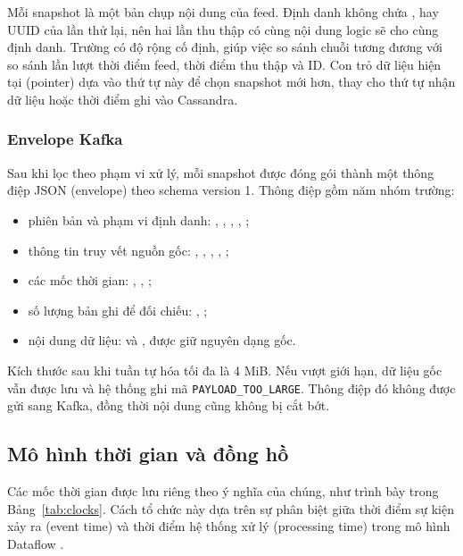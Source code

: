 Mỗi snapshot là một bản chụp nội dung của feed. Định danh  không chứa ,  hay UUID của lần thử lại, nên hai lần thu thập có cùng nội dung logic sẽ cho cùng định danh. Trường  có độ rộng cố định, giúp việc so sánh chuỗi tương đương với so sánh lần lượt thời điểm feed, thời điểm thu thập và ID. Con trỏ dữ liệu hiện tại (pointer) dựa vào thứ tự này để chọn snapshot mới hơn, thay cho thứ tự nhận dữ liệu hoặc thời điểm ghi vào Cassandra.

\subsubsection{Envelope Kafka}

Sau khi lọc theo phạm vi xử lý, mỗi snapshot được đóng gói thành một thông điệp JSON (envelope) theo schema version 1. Thông điệp gồm năm nhóm trường:
\begin{itemize}
    \item phiên bản và phạm vi định danh: , , , , ;
    \item thông tin truy vết nguồn gốc: , , , , ;
    \item các mốc thời gian: , , ;
    \item số lượng bản ghi để đối chiếu: , ;
    \item nội dung dữ liệu:  và , được giữ nguyên dạng gốc.
\end{itemize}
Kích thước sau khi tuần tự hóa tối đa là 4 MiB. Nếu vượt giới hạn, dữ liệu gốc vẫn được lưu và hệ thống ghi mã \texttt{PAYLOAD\_TOO\_LARGE}. Thông điệp đó không được gửi sang Kafka, đồng thời nội dung cũng không bị cắt bớt.

\subsection{Mô hình thời gian và đồng hồ}

Các mốc thời gian được lưu riêng theo ý nghĩa của chúng, như trình bày trong Bảng~\ref{tab:clocks}. Cách tổ chức này dựa trên sự phân biệt giữa thời điểm sự kiện xảy ra (event time) và thời điểm hệ thống xử lý (processing time) trong mô hình Dataflow \cite{dataflow}.

